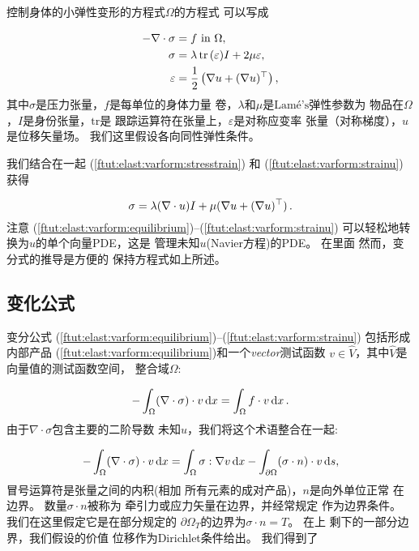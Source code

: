 
控制身体的小弹性变形的方程式$\Omega$的方程式
可以写成

\begin{align}
-\nabla\cdot\sigma &= f\hbox{ in }\Omega,
\label{ftut:elast:varform:equilibrium}\\
\sigma &= \lambda\,\hbox{tr}\,(\varepsilon) I + 2\mu\varepsilon,
\label{ftut:elast:varform:stresstrain}\\
\varepsilon &= \frac{1}{2}\left(\nabla u + (\nabla u)^{\top}\right),
\label{ftut:elast:varform:strainu}
\end{align}
其中$\sigma$是压力张量，$f$是每单位的身体力量
卷，$\lambda$和$\mu$是$\text{Lam\'e's}$弹性参数为
物品在$\Omega$，$I$是身份张量，$\mathrm{tr}$是
跟踪运算符在张量上，$\varepsilon$是对称应变率
张量（对称梯度），$u$是位移矢量场。
我们这里假设各向同性弹性条件。

我们结合在一起 (\ref{ftut:elast:varform:stresstrain}) 和
(\ref{ftut:elast:varform:strainu}) 获得

\begin{equation}
\sigma = \lambda(\nabla\cdot u)I + \mu(\nabla u + (\nabla u)^{\top})\tp
\label{ftut:elast:varform:stressu}
\end{equation}
注意
(\ref{ftut:elast:varform:equilibrium})--(\ref{ftut:elast:varform:strainu})
可以轻松地转换为$u$的单个向量PDE，这是
管理未知$u$(Navier方程)的PDE。 在里面
然而，变分式的推导是方便的
保持方程式如上所述。

\subsection{变化公式}
\label{ftut:elast:varform}

变分公式
(\ref{ftut:elast:varform:equilibrium})--(\ref{ftut:elast:varform:strainu})
包括形成内部产品
(\ref{ftut:elast:varform:equilibrium})和一个\emph{vector}测试函数
$v\in \hat{V}$，其中$\hat{V}$是向量值的测试函数空间，
整合域$\Omega$:

\[ -\int_\Omega (\nabla\cdot\sigma) \cdot v \dx =
\int_\Omega f\cdot v\dx\tp\]
由于$\nabla\cdot\sigma $包含主要的二阶导数
未知$u$，我们将这个术语整合在一起:

\[ -\int_\Omega (\nabla\cdot\sigma) \cdot v \dx
= \int_\Omega \sigma : \nabla v\dx - \int_{\partial\Omega}
(\sigma\cdot n)\cdot v \ds,\]
冒号运算符是张量之间的内积(相加
所有元素的成对产品)，$n$是向外单位正常
在边界。 数量$\sigma\cdot n$被称为
牵引力或应力矢量在边界，并经常规定
作为边界条件。 我们在这里假定它是在部分规定的
$\partial\Omega_T$的边界为$\sigma\cdot n = T$。 在上
剩下的一部分边界，我们假设的价值
位移作为Dirichlet条件给出。 我们得到了

